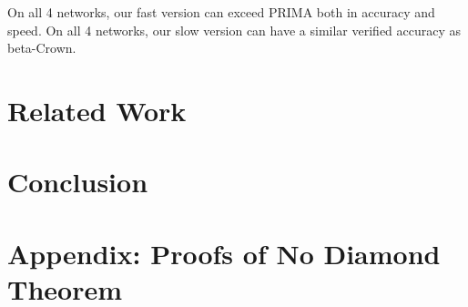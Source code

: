 \documentclass{llncs}
\begin{document}
On all 4 networks, our fast version can exceed PRIMA both in accuracy and speed. On all 4 networks, our slow version can have a similar verified accuracy as beta-Crown.


\section{Related Work}

\section{Conclusion}

\section*{Appendix: Proofs of No Diamond Theorem}




\end{document}
